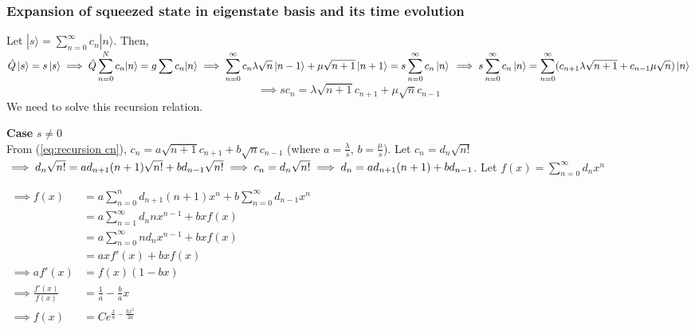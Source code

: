 \documentclass[12pt, twoside]{article}
\begin{document}
\subsubsection{Expansion of squeezed state in eigenstate basis and its time evolution}

Let $\displaystyle | s \rangle = \sum _ { n = 0 } ^ { \infty } c _ { n } | n \rangle$. Then, $\displaystyle\hat { Q } \ket{s} = s \ket{s} \implies \hat { Q } \sum _ { n = 0 } ^ { N } c _ { n } | n \rangle = g \sum c _ { n } | n \rangle \\ \implies \sum _ { n = 0 } ^ { \infty } c _ { n } \lambda \sqrt{n} \ket{n-1} + \mu \sqrt{n+1} \ket{n+1} =s \sum _ { n = 0 } ^ { \infty } c _ { n } \ket{n} \\ \implies s \sum _ { n = 0 } ^ { \infty } c _ { n } \ket{n} = \sum _ { n = 0 } ^ { \infty } (c _ { n+1 } \lambda \sqrt{n+1} +c _ { n-1 } \mu \sqrt{n}) \ket{n}$ \begin{equation}\label{eq:recursion cn}\implies s c_n =  \lambda \sqrt{n+1} c _ { n+1 } + \mu \sqrt{n} c _ { n-1 }\end{equation} 
We need to solve this recursion relation.

\textbf{Case} $s \neq 0$
\\From (\ref{eq:recursion cn}), $ c_n =  a \sqrt{n+1} c _ { n+1 } + b \sqrt{n} c _ { n-1 }$ (where $a = \frac{\lambda}{s}$, $b = \frac{\mu}{s}$). Let $c_n = d_n \sqrt{n!}$ \cite{recursion_substitution} \\ $\implies d_n \sqrt{n!} = a d_{n+1} (n+1) \sqrt{n!} + b d_{n-1} \sqrt{n!} \\ \implies c_n = d_n \sqrt{n!} \\ \implies d_n = a d_{n+1} (n+1)  + b d_{n-1}$. Let $\displaystyle f ( x ) = \sum _ { n = 0 } ^ { \infty } d _ { n } x ^ { n }$

$ \begin{aligned} \implies f ( x ) &= a \sum _ { n = 0 } ^ { n } d _ { n + 1 } ( n + 1 ) x ^ { n } + b \sum _ { n = 0 } ^ { \infty } d _ { n - 1 } x ^ { n } \\ &= { a  \sum _ { n = 1 } ^ { \infty } d _ { n } n x ^ { n - 1 } } + { b x f( x ) } \\ &=  { a \sum _ { n = 0 } ^ { \infty } n d_n x ^ { n - 1 } } + {  b x f ( x ) } \\ &= a x f'(x) + b x f(x) \\\implies a f'(x)  &= f(x) (1-bx)\\ \implies \frac{f'(x)}{f(x)} &= \frac{1}{a} - \frac{b}{a} x \\ \implies f(x) &= C e^{\frac{x}{a} - \frac{bx^2}{2a}}\end{aligned}$
\end{document}
